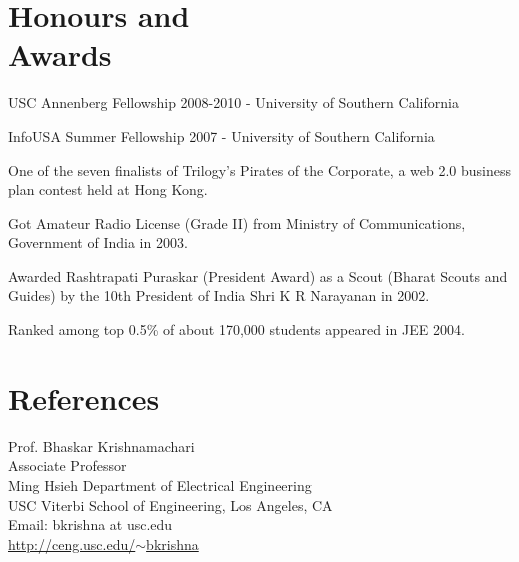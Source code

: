 \documentclass[margin,line]{resume}
\begin{document}
\begin{resume}
\newpage

    
\section{\mysidestyle Honours and\\Awards} 
\begin{list2}
		\item USC Annenberg Fellowship 2008-2010	- University of Southern California			%
    \item InfoUSA Summer Fellowship 2007	- University of Southern California %
	  \item One of the seven finalists of Trilogy's Pirates of the Corporate, a web 2.0 business plan contest held at Hong Kong. %
	  \item Got Amateur Radio License (Grade II) from Ministry of Communications, Government of India in 2003.%
\item Awarded Rashtrapati Puraskar (President Award) as a Scout (Bharat Scouts and Guides) by the 10th President of India Shri K R Narayanan in 2002.%
\item Ranked among top 0.5\% of about 170,000 students appeared in JEE 2004. \\%
\end{list2}
  



\section{\mysidestyle References} 
Prof. Bhaskar Krishnamachari \\
Associate Professor \\
Ming Hsieh Department of Electrical Engineering \\
USC Viterbi School of Engineering, Los Angeles, CA \\
Email: bkrishna at usc.edu \\
\href{http://ceng.usc.edu/~bkrishna}{http://ceng.usc.edu/$\sim$bkrishna}


\end{resume}
\end{document}
